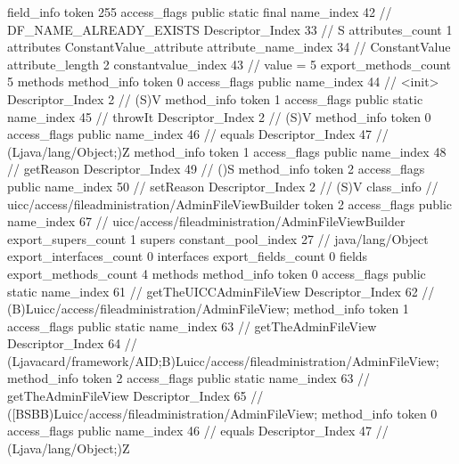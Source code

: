 {{{{{			}
			field_info {
				token	255
				access_flags	public static final
				name_index	42		// DF_NAME_ALREADY_EXISTS
				Descriptor_Index	33		// S
				attributes_count	1
				attributes {
				ConstantValue_attribute {
					attribute_name_index	34		// ConstantValue
					attribute_length	2
					constantvalue_index	43		// value = 5
				}
				}
			}
			}
			export_methods_count	5
			methods {
				method_info {
					token	0
					access_flags	public
					name_index	44		// <init>
					Descriptor_Index	2		// (S)V
				}
				method_info {
					token	1
					access_flags	public static
					name_index	45		// throwIt
					Descriptor_Index	2		// (S)V
				}
				method_info {
					token	0
					access_flags	public
					name_index	46		// equals
					Descriptor_Index	47		// (Ljava/lang/Object;)Z
				}
				method_info {
					token	1
					access_flags	public
					name_index	48		// getReason
					Descriptor_Index	49		// ()S
				}
				method_info {
					token	2
					access_flags	public
					name_index	50		// setReason
					Descriptor_Index	2		// (S)V
				}
			}
		}
		class_info {		// uicc/access/fileadministration/AdminFileViewBuilder
			token	2
			access_flags	public
			name_index	67		// uicc/access/fileadministration/AdminFileViewBuilder
			export_supers_count	1
			supers {
				constant_pool_index	27		// java/lang/Object
			}
			export_interfaces_count	0
			interfaces {
			}
			export_fields_count	0
			fields {
			}
			export_methods_count	4
			methods {
				method_info {
					token	0
					access_flags	public static
					name_index	61		// getTheUICCAdminFileView
					Descriptor_Index	62		// (B)Luicc/access/fileadministration/AdminFileView;
				}
				method_info {
					token	1
					access_flags	public static
					name_index	63		// getTheAdminFileView
					Descriptor_Index	64		// (Ljavacard/framework/AID;B)Luicc/access/fileadministration/AdminFileView;
				}
				method_info {
					token	2
					access_flags	public static
					name_index	63		// getTheAdminFileView
					Descriptor_Index	65		// ([BSBB)Luicc/access/fileadministration/AdminFileView;
				}
				method_info {
					token	0
					access_flags	public
					name_index	46		// equals
					Descriptor_Index	47		// (Ljava/lang/Object;)Z
				}
			}
		}
	}
}
